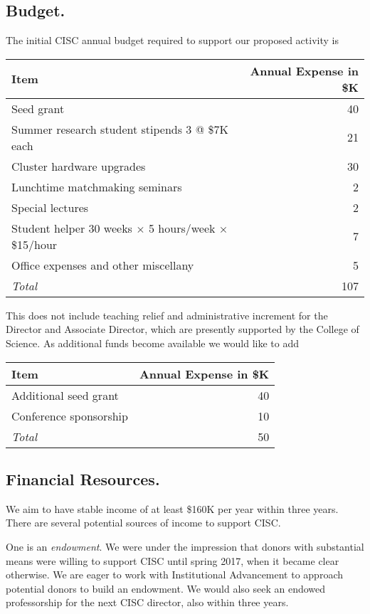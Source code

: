 \documentclass[12pt]{amsart}
\begin{document}
\subsection*{Budget.}
The initial CISC annual budget required to support our proposed activity is 
\begin{center}
    \begin{tabular}{p{}@{\qquad} r}
\textbf{Item} & \textbf{Annual Expense in \$K} \\
\toprule
    Seed grant  & 40 \\
    Summer research student stipends 3 @ \$7K each & 21 \\
    Cluster hardware upgrades & 30 \\
    Lunchtime matchmaking seminars & 2 \\
    Special lectures & 2 \\
    Student helper 30 weeks $\times$ 5 hours/week $\times$ \$15/hour & 7 \\
    Office expenses and other miscellany & 5 \\
    \bottomrule
    \emph{Total} & 107
\end{tabular}
\end{center}
This does not include teaching relief and administrative increment for the Director and Associate Director, which are presently supported by the College of Science.  As additional funds become available we would like to add 
\begin{center}
    \begin{tabular}{p{}@{\qquad} r}
\textbf{Item} & \textbf{Annual Expense in \$K} \\
\toprule
    Additional seed grant  & 40 \\
    Conference sponsorship & 10 \\
    \bottomrule
    \emph{Total} & 50
\end{tabular}
\end{center}

\subsection*{Financial Resources.}
We aim to have stable income of at least \$160K per year within three years.
There are several potential sources of income to support CISC.  

One is an \emph{endowment}.  We were under the impression that donors with substantial means were willing to support CISC until spring 2017, when it became clear otherwise.  We are eager to work with Institutional Advancement to approach potential donors to build an endowment.  We would also seek an endowed professorship for the next CISC director, also within three years.
\end{document}
